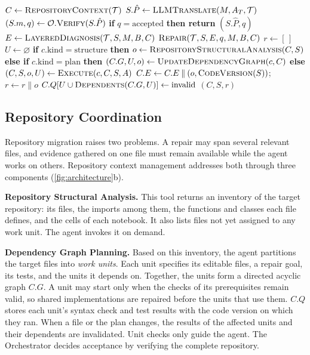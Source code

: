 \documentclass{article}
\begin{document}
\vspace{8pt}
\begin{algorithm}[!htb]
\caption{Repository migration and repair coordination}
\label{alg:repository}
\small
\begin{algorithmic}[1]
  \State $C\gets\Call{RepositoryContext}{\mathcal T}$
  \State $S.\hat P\gets\Call{LLMTranslate}{M,A_T,\mathcal T}$
  \State $(S.m,q)\gets\mathcal O.\Call{Verify}{S.\hat P}$ 
  \State \textbf{if} $q=\mathrm{accepted}$ \textbf{then return} $(S.\hat P,q)$
  \State $E\gets\Call{LayeredDiagnosis}{\mathcal T,S,M,B,C}$ 
  \State \Return $\Call{Repair}{\mathcal T,S,E,q,M,B,C}$ 
\EndFunction
{}
  \State $r\gets[\,]$
    \State $U\gets\varnothing$
    \State \textbf{if} $c.\mathrm{kind}=\mathrm{structure}$ \textbf{then} $o\gets\Call{RepositoryStructuralAnalysis}{C,S}$
    \State \textbf{else if} $c.\mathrm{kind}=\mathrm{plan}$ \textbf{then} $(C.G,U,o)\gets\Call{UpdateDependencyGraph}{c,C}$
    \State \textbf{else} $(C,S,o,U)\gets\Call{Execute}{c,C,S,A}$
    \State $C.E\gets C.E\mathbin{\|}(o,\Call{CodeVersion}{S})$; $r\gets r\mathbin{\|}o$
    \State $C.Q[U\cup\Call{Dependents}{C.G,U}]\gets\mathrm{invalid}$
  \EndFor
  \State \Return $(C,S,r)$
\EndFunction
\end{algorithmic}
\end{algorithm}

\subsection{Repository Coordination}
\label{sec:repository-method}
Repository migration raises two problems. A repair may span several relevant files, and evidence gathered on one file must remain available while the agent works on others. Repository context management addresses both through three components (\cref{fig:architecture}b).

\textbf{Repository Structural Analysis.} This tool returns an inventory of the target repository: its files, the imports among them, the functions and classes each file defines, and the cells of each notebook. It also lists files not yet assigned to any work unit. The agent invokes it on demand.

\textbf{Dependency Graph Planning.} Based on this inventory, the agent partitions the target files into \emph{work units}. Each unit specifies its editable files, a repair goal, its tests, and the units it depends on. Together, the units form a directed acyclic graph $C.G$. A unit may start only when the checks of its prerequisites remain valid, so shared implementations are repaired before the units that use them. $C.Q$ stores each unit's syntax check and test results with the code version on which they ran. When a file or the plan changes, the results of the affected units and their dependents are invalidated. Unit checks only guide the agent. The Orchestrator decides acceptance by verifying the complete repository.
\end{document}
